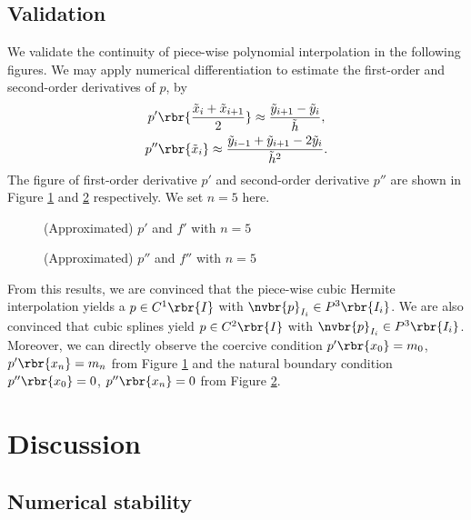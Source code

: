 \documentclass[english, nochinese]{pnote}
\begin{document}
\subsection{Validation}

We validate the continuity of piece-wise polynomial interpolation in the following figures. We may apply numerical differentiation to estimate the first-order and second-order derivatives of $p$, by
\begin{gather}
p' \rbr{\frac{ \tilde{x}_i + \tilde{x}_{ i + 1 } }{2}} \approx \frac{ \tilde{y}_{ i + 1 } - \tilde{y}_i }{\tilde{h}}, \\
p'' \rbr{\tilde{x}_i} \approx \frac{ \tilde{y}_{ i - 1 } + \tilde{y}_{ i + 1 } - 2 \tilde{y}_i }{\tilde{h}^2}.
\end{gather}
The figure of first-order derivative $p'$ and second-order derivative $p''$ are shown in Figure \ref{Fig:ValFirst} and \ref{Fig:ValSecond} respectively. We set $ n = 5 $ here.

\begin{figure}
\centering
\scalebox{0.7}{}
\caption{(Approximated) $p'$ and $f'$ with $ n = 5 $}
\label{Fig:ValFirst}
\end{figure}

\begin{figure}
\centering
\scalebox{0.7}{}
\caption{(Approximated) $p''$ and $f''$ with $ n = 5 $}
\label{Fig:ValSecond}
\end{figure}

From this results, we are convinced that the piece-wise cubic Hermite interpolation yields a $ p \in C^1 \rbr{I} $ with $ \nvbr{p}_{I_i} \in P^3 \rbr{I_i} $. We are also convinced that cubic splines yield $ p \in C^2 \rbr{I} $ with $ \nvbr{p}_{I_i} \in P^3 \rbr{I_i} $. Moreover, we can directly observe the coercive condition $ p' \rbr{x_0} = m_0 $, $ p' \rbr{x_n} = m_n $ from Figure \ref{Fig:ValFirst} and the natural boundary condition $ p'' \rbr{x_0} = 0 $, $ p'' \rbr{x_n} = 0 $ from Figure \ref{Fig:ValSecond}.

\section{Discussion}

\subsection{Numerical stability}
\end{document}
